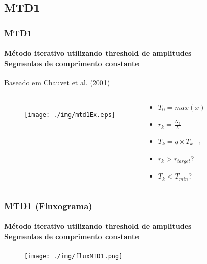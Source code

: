 \documentclass{beamer}
\begin{document}
	\subsection[MTD1]{MTD1}
	\begin{frame}
		\frametitle{MTD1}
		\framesubtitle{Método iterativo utilizando threshold de amplitudes \\ Segmentos de comprimento constante}
		
		Baseado em Chauvet et al. (2001)
		
		\begin{columns}[c]
		
				\begin{figure}
					\begin{center}
						\texttt{[image: ./img/mtd1Ex.eps]}
					\end{center}
				\end{figure}
		
				\begin{exampleblock}{}
					\begin{itemize}
						\item $T_0 = max(x)$
						\item $r_k = \frac{N_k}{L}$
						\item $T_k = q \times T_{k-1}$
						\item $r_k > r_{target}$?
						\item $T_k < T_{min}$?
					\end{itemize}
				\end{exampleblock}
			
		\end{columns}
	\end{frame}
	
	\begin{frame}
		\frametitle{MTD1 (Fluxograma)}
		\framesubtitle{Método iterativo utilizando threshold de amplitudes \\ Segmentos de comprimento constante}
		
		\begin{figure}
			\begin{center}
				\texttt{[image: ./img/fluxMTD1.png]}
			\end{center}
		\end{figure}

	\end{frame}
	
\end{document}
